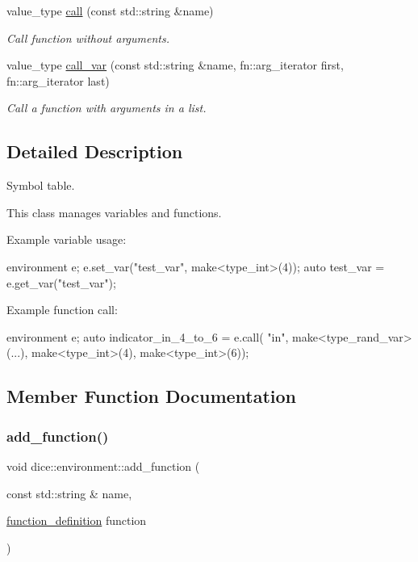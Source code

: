 \begin{DoxyCompactItemize}
value\+\_\+type \mbox{\hyperlink{classdice_1_1environment_a5cccfa275b5e57024f532f1c5c7f2b8c}{call}} (const std\+::string \&name)
\begin{DoxyCompactList}\small\item\em Call function without arguments. \end{DoxyCompactList}\item 
value\+\_\+type \mbox{\hyperlink{classdice_1_1environment_a6736fed1b36c26714c20902dbe0d3bc0}{call\+\_\+var}} (const std\+::string \&name, fn\+::arg\+\_\+iterator first, fn\+::arg\+\_\+iterator last)
\begin{DoxyCompactList}\small\item\em Call a function with arguments in a list. \end{DoxyCompactList}\end{DoxyCompactItemize}


\subsection{Detailed Description}
Symbol table. 

This class manages variables and functions.

Example variable usage\+: 
\begin{DoxyCode}
environment e;
e.set\_var(\textcolor{stringliteral}{"test\_var"}, make<type\_int>(4));
\textcolor{keyword}{auto} test\_var = e.get\_var(\textcolor{stringliteral}{"test\_var"});
\end{DoxyCode}


Example function call\+: 
\begin{DoxyCode}
environment e;
\textcolor{keyword}{auto} indicator\_in\_4\_to\_6 = e.call(
     \textcolor{stringliteral}{"in"}, 
     make<type\_rand\_var>(...), 
     make<type\_int>(4), 
     make<type\_int>(6));
\end{DoxyCode}
 

\subsection{Member Function Documentation}
\mbox{\label{classdice_1_1environment_aa536347c73a806f197f6f61348235b47}} 
\subsubsection{\texorpdfstring{add\+\_\+function()}{add\_function()}}
{\footnotesize\ttfamily void dice\+::environment\+::add\+\_\+function (\begin{DoxyParamCaption}\item[{const std\+::string \&}]{name,  }\item[{\mbox{\hyperlink{classdice_1_1function__definition}{function\+\_\+definition}}}]{function }\end{DoxyParamCaption})}



